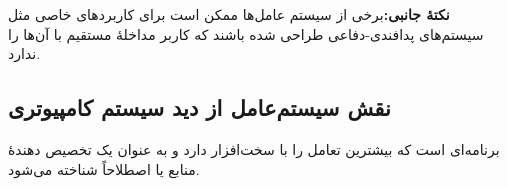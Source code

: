 \documentclass{article}
\begin{document}
%
\vspace{.2cm}
\textbf{ نکتۀ جانبی:}برخی از سیستم عامل‌ها ممکن است برای کاربردهای خاصی مثل سیستم‌های پدافندی-دفاعی طراحی شده باشند که کاربر مداخلۀ مستقیم با آن‌ها را ندارد.

\subsection{نقش سیستم‌عامل از دید سیستم کامپیوتری }
برنامه‌ای است که بیشترین تعامل را با سخت‌افزار دارد و به عنوان یک تخصیص دهندۀ منابع یا اصطلاحاً 
 شناخته می‌شود.
\end{document}
